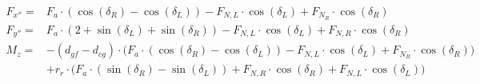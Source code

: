 \begin{equation}
\begin{aligned}
    F_{x''} =& F_a \cdot (\cos(\delta_R) - \cos(\delta_L)) -F_{N,L} \cdot \cos(\delta_L) + F_{N_R} \cdot \cos(\delta_R) \\
    F_{y''} =& F_a \cdot (2 + \sin(\delta_L) + \sin(\delta_R)) - F_{N,L} \cdot \cos(\delta_L) + F_{N,R} \cdot \cos(\delta_R) \\
    M_z =& -(d_{gf}-d_{cg}) \cdot \bigg(F_a \cdot (\cos(\delta_R) - \cos(\delta_L)) -F_{N,L} \cdot \cos(\delta_L) + F_{N_R} \cdot \cos(\delta_R)\bigg) \\&+ r_r \cdot \bigg(F_{a} \cdot(\sin(\delta_R)-\sin(\delta_L) )+ F_{N,R} \cdot \cos(\delta_R) + F_{N,L} \cdot \cos(\delta_L)\bigg)
\end{aligned}
\label{eq:ACS_para_perp}
\end{equation}

